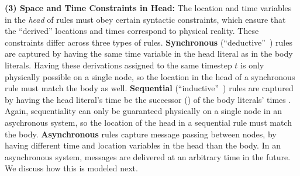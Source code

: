 \textbf{(3) Space and Time Constraints in Head:} The location and time variables in the \emph{head} of rules must obey certain syntactic constraints, which 
ensure that the ``derived'' locations and times correspond to physical reality. 
These constraints differ across three types of rules.
\textbf{Synchronous} (``deductive''~\cite{dedalus}) 
rules are captured by having the same time variable in the head literal as in the body literals. Having these derivations assigned to the same timestep $t$ is only physically possible on a single node, so the location in the head of a synchronous rule must match the body as well. 
\textbf{Sequential} (``inductive''~\cite{dedalus}) rules are captured by having the head literal's time be the successor () of the body literals' times .
Again, sequentiality can only be guaranteed physically on a single node in an asychronous system, so the location of the head in a sequential rule must match the body.
\textbf{Asynchronous} rules capture message passing between nodes, by having different
time and location variables in the head than the body. In an asynchronous system, messages are delivered at an arbitrary time in the future.
We discuss how this is modeled next. 

